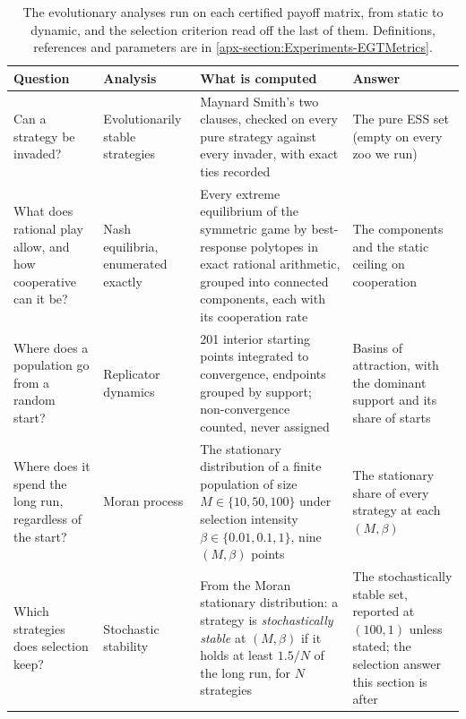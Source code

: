 \begin{table}[t]
\centering\small
\begin{tabular}{@{}p{3.6cm}p{2.9cm}p{5.2cm}p{3.3cm}@{}}
\toprule
Question & Analysis & What is computed & Answer \\
\midrule
Can a strategy be invaded? & Evolutionarily stable strategies & Maynard Smith's two clauses, checked on every pure strategy against every invader, with exact ties recorded & The pure ESS set (empty on every zoo we run) \\
What does rational play allow, and how cooperative can it be? & Nash equilibria, enumerated exactly & Every extreme equilibrium of the symmetric game by best-response polytopes in exact rational arithmetic, grouped into connected components, each with its cooperation rate & The components and the static ceiling on cooperation \\
Where does a population go from a random start? & Replicator dynamics & 201 interior starting points integrated to convergence, endpoints grouped by support; non-convergence counted, never assigned & Basins of attraction, with the dominant support and its share of starts \\
Where does it spend the long run, regardless of the start? & Moran process & The stationary distribution of a finite population of size $M \in \{10, 50, 100\}$ under selection intensity $\beta \in \{0.01, 0.1, 1\}$, nine $(M,\beta)$ points & The stationary share of every strategy at each $(M,\beta)$ \\
Which strategies does selection keep? & Stochastic stability & From the Moran stationary distribution: a strategy is \emph{stochastically stable} at $(M,\beta)$ if it holds at least $1.5/N$ of the long run, for $N$ strategies & The stochastically stable set, reported at $(100, 1)$ unless stated; the selection answer this section is after \\
\bottomrule
\end{tabular}
\caption{The evolutionary analyses run on each certified payoff matrix, from static to dynamic, and the selection criterion read off the last of them. Definitions, references and parameters are in \cref{apx-section:Experiments-EGTMetrics}.}
\label{tab:egt-stages}
\end{table}
